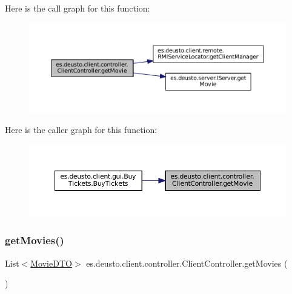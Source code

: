 Here is the call graph for this function\+:
\nopagebreak
\begin{figure}[H]
\begin{center}
\leavevmode
\includegraphics[width=350pt]{classes_1_1deusto_1_1client_1_1controller_1_1_client_controller_ae371135958d6f88011239d360d936ada_cgraph}
\end{center}
\end{figure}
Here is the caller graph for this function\+:
\nopagebreak
\begin{figure}[H]
\begin{center}
\leavevmode
\includegraphics[width=350pt]{classes_1_1deusto_1_1client_1_1controller_1_1_client_controller_ae371135958d6f88011239d360d936ada_icgraph}
\end{center}
\end{figure}
\mbox{\label{classes_1_1deusto_1_1client_1_1controller_1_1_client_controller_ad69e183cc953af14b9d526c635eecb61}} 
\subsubsection{\texorpdfstring{getMovies()}{getMovies()}}
{\footnotesize\ttfamily List$<$\mbox{\hyperlink{classes_1_1deusto_1_1server_1_1data_1_1_movie_d_t_o}{Movie\+D\+TO}}$>$ es.\+deusto.\+client.\+controller.\+Client\+Controller.\+get\+Movies (\begin{DoxyParamCaption}{ }\end{DoxyParamCaption})}



